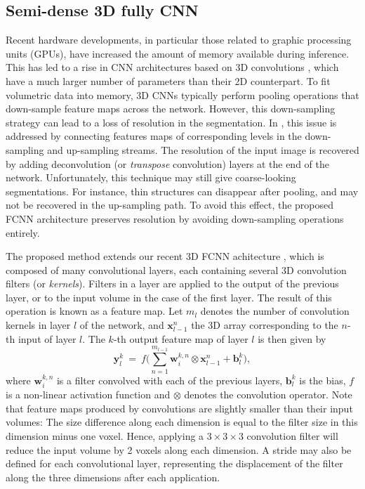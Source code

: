 \documentclass[twoside,espcrc2]{elsarticle}
\newcommand{\vold}[1]{$#1\!\times\!#1\!\times\!#1$}
\renewcommand{\vec}[1]{\mathbf{#1}}
\newcommand{\xx}{\vec x}
\newcommand{\yy}{\vec y}
\newcommand{\bb}{\vec b}
\newcommand{\WW}{\vec w}
\begin{document}
\subsection{Semi-dense 3D fully CNN}
\label{ssec:semi-dense}



Recent hardware developments, in particular those related to graphic processing units (GPUs), have increased the amount of memory available during inference. This has led to a rise in CNN architectures based on 3D convolutions \cite{kamnitsas2017efficient,dou20163d,milletari2016v,lu2017automatic}, which have a much larger number of parameters than their 2D counterpart. To fit volumetric data into memory, 3D CNNs typically perform pooling operations that down-sample feature maps across the network. However, this down-sampling strategy can lead to a loss of resolution in the segmentation. In \cite{long2015fully}, this issue is addressed by connecting features maps of corresponding levels in the down-sampling and up-sampling streams. The resolution of the input image is recovered by adding deconvolution (or \emph{transpose} convolution) layers at the end of the network. Unfortunately, this technique may still give coarse-looking segmentations. For instance, thin structures can disappear after pooling, and may not be recovered in the up-sampling path. To avoid this effect, the proposed FCNN architecture preserves resolution by avoiding down-sampling operations entirely. 

The proposed method extends our recent 3D FCNN achitecture \cite{DolzNeuro2017}, which is composed of many convolutional layers, each containing several 3D convolution filters (or \emph{kernels}). Filters in a layer are applied to the output of the previous layer, or to the input volume in the case of the first layer. The result of this operation is known as a feature map. Let $m_l$ denotes the number of convolution kernels in layer $l$ of the network, and $\xx^n_{l-1}$ the 3D array corresponding to the $n$-th input of layer $l$. The $k$-th output feature map of layer $l$ is then given by
\begin{equation}
    \yy^k_l \ = \ f\Big(\sum^{m_{l-1}}_{n=1} \WW^{k,n}_{i} \otimes \xx^n_{l-1} + \bb^{k}_{l}\Big),
\end{equation} 
where $\WW^{k,n}_{i}$ is a filter convolved with each of the previous layers, $\bb^{k}_{l}$ is the bias, $f$ is a non-linear activation function and $\otimes$ denotes the convolution operator. Note that feature maps produced by convolutions are slightly smaller than their input volumes: The size difference along each dimension is equal to the filter size in this dimension minus one voxel. Hence, applying a \vold{3} convolution filter will reduce the input volume by 2 voxels along each dimension. A stride may also be defined for each convolutional layer, representing the displacement of the filter along the three dimensions after each application.
\end{document}

